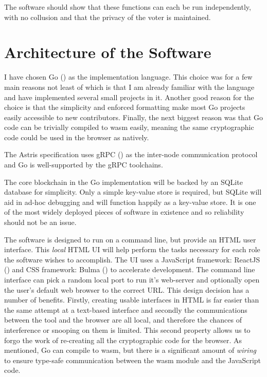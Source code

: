 The software should show that these functions can each be run independently, with no collusion and that the privacy of the voter is maintained.

\section{Architecture of the Software}
\label{ch:sw:architecture}

I have chosen Go () as the implementation language. This choice was for a few main reasons not least of which is that I am already familiar with the language and have implemented several small projects in it. Another good reason for the choice is that the simplicity and enforced formatting make most Go projects easily accessible to new contributors. Finally, the next biggest reason was that Go code can be trivially compiled to \gls{wasm} easily, meaning the same cryptographic code could be used in the browser as natively.

The Astris specification uses gRPC () as the inter-node communication protocol and Go is well-supported by the gRPC toolchains.

The core blockchain in the Go implementation will be backed by an SQLite database for simplicity. Only a simple key-value store is required, but SQLite will aid in ad-hoc debugging and will function happily as a key-value store. It is one of the most widely deployed pieces of software in existence \cite{MostWidelyDeployed} and so reliability should not be an issue.

The software is designed to run on a command line, but provide an HTML user interface. This \emph{local} HTML UI will help perform the tasks necessary for each role the software wishes to accomplish. The UI uses a JavaScript framework: ReactJS () and CSS framework: Bulma () to accelerate development. The command line interface can pick a random local port to run it's web-server and optionally open the user's default web browser to the correct URL. This design decision has a number of benefits. Firstly, creating usable interfaces in HTML is far easier than the same attempt at a text-based interface and secondly the communications between the tool and the browser are all local, and therefore the chances of interference or snooping on them is limited. This second property allows us to forgo the work of re-creating all the cryptographic code for the browser. As mentioned, Go can compile to \gls{wasm}, but there is a significant amount of \emph{wiring} to ensure type-safe communication between the \gls{wasm} module and the JavaScript code.

